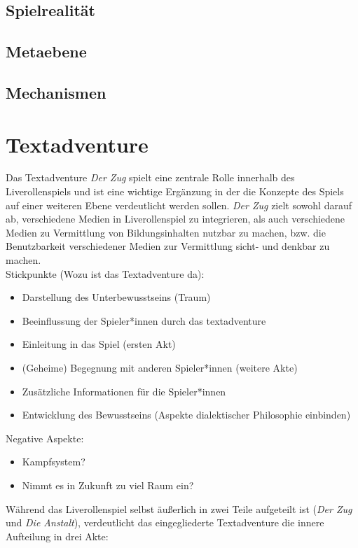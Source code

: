 \documentclass[a4paper, 12pt]{scrartcl}
\begin{document}
    \subsection{Spielrealität}
    \subsection{Metaebene}
    \subsection{Mechanismen}

    \section{Textadventure} \label{textadventure} 
    Das Textadventure \textit{Der Zug} spielt eine zentrale Rolle innerhalb des Liverollenspiels und ist eine wichtige Ergänzung in der die Konzepte des Spiels auf einer weiteren Ebene verdeutlicht werden sollen. 
    \textit{Der Zug} zielt sowohl darauf ab, verschiedene Medien in Liverollenspiel zu integrieren, als auch verschiedene Medien zu Vermittlung von Bildungsinhalten nutzbar zu machen, bzw. die Benutzbarkeit verschiedener Medien zur Vermittlung sicht- und denkbar zu machen.\\
    Stickpunkte (Wozu ist das Textadventure da):
    \begin{itemize}
    \item Darstellung des Unterbewusstseins (Traum)
    \item Beeinflussung der Spieler*innen durch das textadventure
    \item Einleitung in das Spiel (ersten Akt)
    \item (Geheime) Begegnung mit anderen Spieler*innen (weitere Akte)
    \item Zusätzliche Informationen für die Spieler*innen
    \item Entwicklung des Bewusstseins (Aspekte dialektischer Philosophie einbinden)
    \end{itemize}
    Negative Aspekte:
    \begin{itemize}
    \item Kampfsystem?
    \item Nimmt es in Zukunft zu viel Raum ein? 
    \end{itemize}
    Während das Liverollenspiel selbst äußerlich in zwei Teile aufgeteilt ist (\textit{Der Zug} und \textit{Die Anstalt}), verdeutlicht das eingegliederte Textadventure die innere Aufteilung in drei Akte: 
\end{document}

